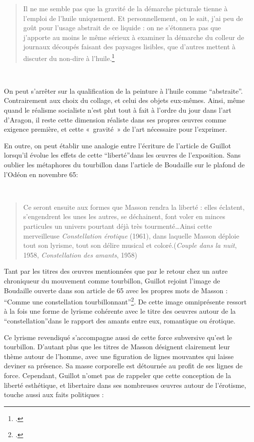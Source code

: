 \begin{quote}
Il ne me semble pas que la gravité de la démarche picturale tienne à l’emploi de l’huile uniquement. Et personnellement, on le sait, j’ai peu de goût pour l’usage abstrait de ce liquide : on ne s’étonnera pas que j’apporte au moins le même sérieux à examiner la démarche du colleur de journaux découpés faisant des paysages lisibles, que d’autres mettent à discuter du non-dire à l’huile.\footcite{hoffmeister}\end{quote}
 

	 On peut s’arrêter sur la qualification de la peinture à l’huile comme \enquote{abstraite}. Contrairement aux choix du collage, et celui des objets eux-mêmes. Ainsi, même quand le réalisme socialiste n’est plut tout à fait à l’ordre du jour dans l’art d’Aragon, il reste cette dimension réaliste dans ses propres \oe{}uvres comme exigence première, et cette « gravité » de l’art nécessaire pour l’exprimer.

En outre, on peut établir une analogie entre l’écriture de l’article de Guillot lorsqu'il évolue les effets de cette \enquote{liberté}dans les \oe{}uvres de l’exposition. Sans oublier les métaphores du tourbillon dans l’article de Boudaille sur le plafond de l’Odéon en novembre 65: 

 \begin{quote}
Ce seront ensuite aux formes que Masson rendra la liberté : elles éclatent, s’engendrent les unes les autres, se déchainent, font voler en minces particules un univers pourtant déjà très tourmenté…Ainsi cette merveilleuse \emph{Constellation érotique} (1961), dans laquelle Masson déploie tout son lyrisme, tout son délire musical et coloré.(\emph{Couple dans la nuit}, 1958, \emph{Constellation des amants}, 1958)	
\end{quote}

	Tant par les titres des \oe{}uvres mentionnées que par le retour chez un autre chroniqueur du mouvement comme tourbillon, Guillot rejoint l’image de Boudaille ouverte dans son article de 65 avec les propres mots de Masson : \enquote{Comme une constellation tourbillonnant}\footcite{avantinauguration}. De cette image omniprésente ressort à la fois une forme de lyrisme cohérente avec le titre des oeuvres autour de la \enquote{constellation}dans le rapport des amants entre eux, romantique ou érotique. 

Ce lyrisme revendiqué s’accompagne aussi de cette force subversive qu’est le tourbillon. D’autant plus que les titres de Masson désignent clairement leur thème autour de l’homme, avec une figuration de lignes mouvantes qui laisse deviner sa présence. Sa masse corporelle est détournée au profit de ses lignes de force. Cependant, Guillot n’omet pas de rappeler que cette conception de la liberté esthétique, et libertaire dans ses nombreuses \oe{}uvres autour de l’érotisme, touche aussi aux faits politiques : 

